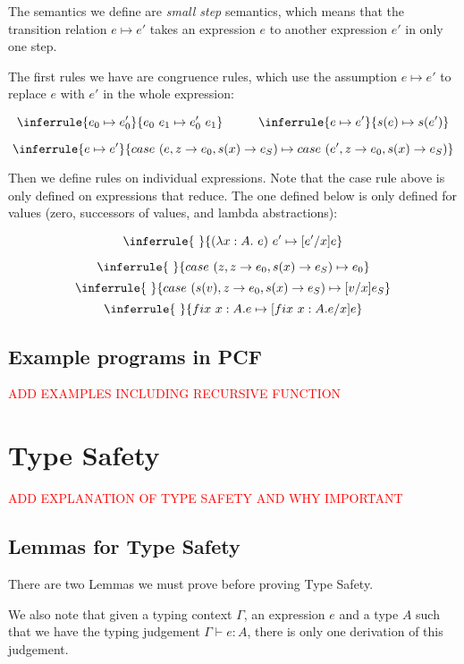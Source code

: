 The semantics we define are \emph{small step} semantics, which means that the transition relation $e \mapsto e'$ takes an expression $e$ to another expression $e'$ in only one step.

The first rules we have are congruence rules, which use the assumption $e \mapsto e'$ to replace $e$ with $e'$ in the whole expression:

$$
\inferrule { e_0 \mapsto e_0'} {e_0 \ e_1 \mapsto e_0' \ e_1}
\hspace{1cm}
\inferrule { e \mapsto e'} {s(e) \mapsto s(e')}
$$

$$
\inferrule { e \mapsto e'} {case \ (e, z \to e_0 , s(x) \to e_S) \mapsto case \ (e', z \to e_0 , s(x) \to e_S)}
$$

Then we define rules on individual expressions. Note that the case rule above is only defined on expressions that reduce. The one defined below is only defined for values (zero, successors of values, and lambda abstractions):  

$$
\inferrule{ \ }
 {(\lambda x: A .\ e) \ e' \mapsto [e'/x]e}
$$

$$
\inferrule{ \ }
{case \ (z, z \to e_0 , s(x) \to e_S) \mapsto e_0}
$$
$$
\inferrule{ \ }
{case \ (s(v), z \to e_0 , s(x) \to e_S) \mapsto [v/x]e_S}
$$
$$
\inferrule{ \ }
{fix \ x:A. e \mapsto [fix \ x:A. e/x]e}
$$


\section{Example programs in PCF}

\textcolor{red}{ADD EXAMPLES INCLUDING RECURSIVE FUNCTION}

\chapter{Type Safety}
\textcolor{red}{ADD EXPLANATION OF TYPE SAFETY AND WHY IMPORTANT}

\section{Lemmas for Type Safety}
There are two Lemmas we must prove before proving Type Safety.

We also note that given a typing context $\Gamma$, an expression $e$ and a type $A$ such that we have the typing judgement $\Gamma \vdash e : A$, there is only one derivation of this judgement.


